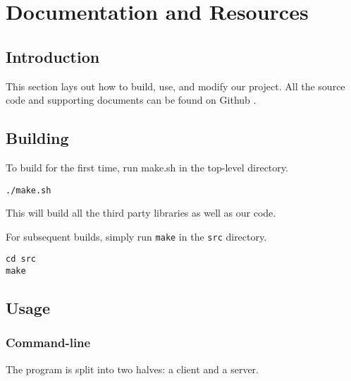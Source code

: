 \chapter{Documentation and Resources}



\section{Introduction}

This section lays out how to build, use, and modify our project.
All the source code and supporting documents can be found on Github \cite{Github}.

\section{Building}

To build for the first time, run make.sh in the top-level directory.

\begin{lstlisting}
./make.sh
\end{lstlisting}

This will build all the third party libraries as well as our code.

For subsequent builds, simply run \texttt{make} in the \texttt{src} directory.

\begin{lstlisting}
cd src
make
\end{lstlisting}

\section{Usage}

\subsection{Command-line}

The program is split into two halves: a client and a server.

